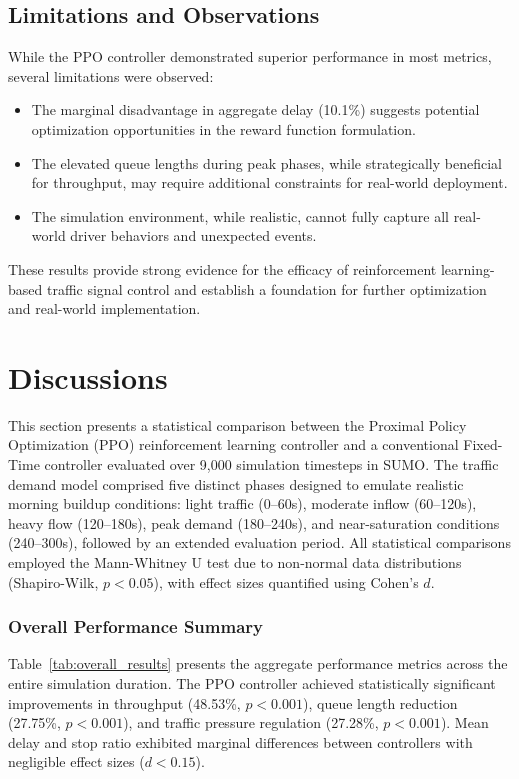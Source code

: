 \documentclass[11pt, a4paper]{report}
\begin{document}
\section{Limitations and Observations}

While the PPO controller demonstrated superior performance in most metrics, several limitations were observed:

\begin{itemize}
    \item The marginal disadvantage in aggregate delay (10.1\%) suggests potential optimization opportunities in the reward function formulation.
    \item The elevated queue lengths during peak phases, while strategically beneficial for throughput, may require additional constraints for real-world deployment.
    \item The simulation environment, while realistic, cannot fully capture all real-world driver behaviors and unexpected events.
\end{itemize}

These results provide strong evidence for the efficacy of reinforcement learning-based traffic signal control and establish a foundation for further optimization and real-world implementation.

\chapter{Discussions}

This section presents a statistical comparison between the Proximal Policy Optimization (PPO) reinforcement learning controller and a conventional Fixed-Time controller evaluated over 9,000 simulation timesteps in SUMO. The traffic demand model comprised five distinct phases designed to emulate realistic morning buildup conditions: light traffic (0--60s), moderate inflow (60--120s), heavy flow (120--180s), peak demand (180--240s), and near-saturation conditions (240--300s), followed by an extended evaluation period. All statistical comparisons employed the Mann-Whitney U test due to non-normal data distributions (Shapiro-Wilk, $p < 0.05$), with effect sizes quantified using Cohen's $d$.

\subsection{Overall Performance Summary}

Table~\ref{tab:overall_results} presents the aggregate performance metrics across the entire simulation duration. The PPO controller achieved statistically significant improvements in throughput (48.53\%, $p < 0.001$), queue length reduction (27.75\%, $p < 0.001$), and traffic pressure regulation (27.28\%, $p < 0.001$). Mean delay and stop ratio exhibited marginal differences between controllers with negligible effect sizes ($d < 0.15$).
\end{document}

